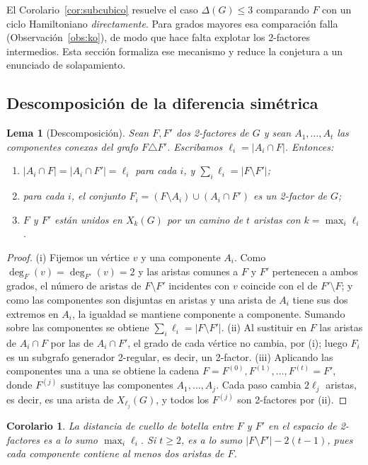 \documentclass[11pt,a4paper]{article}
\newtheorem{lema}[teorema]{Lema}
\newtheorem{corolario}[teorema]{Corolario}
\theoremstyle{definition}
\theoremstyle{remark}
\begin{document}
El Corolario~\ref{cor:subcubico} resuelve el caso $\Delta(G)\le3$ comparando $F$ con un ciclo Hamiltoniano \emph{directamente}. Para grados mayores esa comparación falla (Observación~\ref{obs:ko}), de modo que hace falta explotar los 2-factores intermedios. Esta sección formaliza ese mecanismo y reduce la conjetura a un enunciado de solapamiento.

\subsection{Descomposición de la diferencia simétrica}

\begin{lema}[Descomposición]\label{lem:descomp}
Sean $F,F'$ dos 2-factores de $G$ y sean $A_1,\dots,A_t$ las componentes conexas del grafo $F\triangle F'$. Escribamos $\ell_i=|A_i\cap F|$. Entonces:
\begin{enumerate}[label=(\roman*)]
\item $|A_i\cap F|=|A_i\cap F'|=\ell_i$ para cada $i$, y $\sum_i\ell_i=|F\setminus F'|$;
\item para cada $i$, el conjunto $F_i=(F\setminus A_i)\cup(A_i\cap F')$ es un 2-factor de $G$;
\item $F$ y $F'$ están unidos en $X_k(G)$ por un camino de $t$ aristas con $k=\max_i\ell_i$.
\end{enumerate}
\end{lema}

\begin{proof}
(i) Fijemos un vértice $v$ y una componente $A_i$. Como $\deg_F(v)=\deg_{F'}(v)=2$ y las aristas comunes a $F$ y $F'$ pertenecen a ambos grados, el número de aristas de $F\setminus F'$ incidentes con $v$ coincide con el de $F'\setminus F$; y como las componentes son disjuntas en aristas y una arista de $A_i$ tiene sus dos extremos en $A_i$, la igualdad se mantiene componente a componente. Sumando sobre las componentes se obtiene $\sum_i\ell_i=|F\setminus F'|$.
(ii) Al sustituir en $F$ las aristas de $A_i\cap F$ por las de $A_i\cap F'$, el grado de cada vértice no cambia, por (i); luego $F_i$ es un subgrafo generador 2-regular, es decir, un 2-factor.
(iii) Aplicando las componentes una a una se obtiene la cadena $F=F^{(0)},F^{(1)},\dots,F^{(t)}=F'$, donde $F^{(j)}$ sustituye las componentes $A_1,\dots,A_j$. Cada paso cambia $2\ell_j$ aristas, es decir, es una arista de $X_{\ell_j}(G)$, y todos los $F^{(j)}$ son 2-factores por (ii).
\end{proof}

\begin{corolario}\label{cor:bottleneck}
La distancia de cuello de botella entre $F$ y $F'$ en el espacio de 2-factores es a lo sumo $\max_i\ell_i$. Si $t\ge2$, es a lo sumo $|F\setminus F'|-2(t-1)$, pues cada componente contiene al menos dos aristas de $F$.
\end{corolario}
\end{document}
